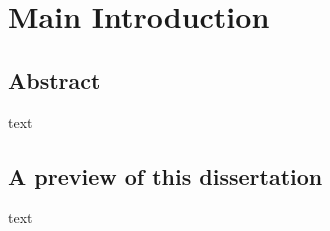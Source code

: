 
\chapter{Main Introduction}\label{chapter:intro1}

\section{Abstract}
text

\section{A preview of this dissertation}
text


